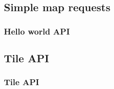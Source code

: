 \documentclass[17pt]{beamer}
\begin{document}
\subsection{Simple map requests}

\begin{frame}[fragile]
  \frametitle{Hello world API}
  \begin{block}{}
    \only<1>{
      
    }
    \only<2>{
      
    }
  \end{block}
\end{frame}

\subsection{Tile API}


\begin{frame}[fragile]
  \frametitle{Tile API}
  \begin{block}{}
    \only<1>{
      
    }
    \only<2>{
      
    }
  \end{block}
\end{frame}








\end{document}
